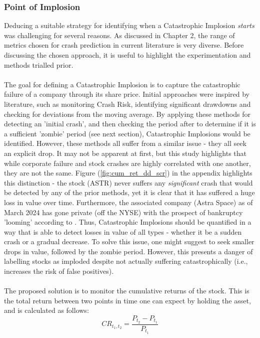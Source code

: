 \documentclass[a4paper]{report}
\begin{document}
\subsubsection{Point of Implosion}
Deducing a suitable strategy for identifying when a Catastrophic Implosion \textit{starts} was challenging for several reasons. As discussed in Chapter 2, the range of metrics chosen for crash prediction in current literature is very diverse. Before discussing the chosen approach, it is useful to highlight the experimentation 
and methods trialled prior.\\\\The goal for defining a Catastrophic Implosion is to capture the catastrophic failure of a company through its share price. Initial approaches were inspired by literature, such as monitoring Crash Risk, identifying significant drawdowns and checking
for deviations from the moving average. By applying these methods for detecting an 'initial crash', and then checking the period after to determine if it is a sufficient 'zombie' period (see next section), Catastrophic Implosions would be identified. However, these methods all suffer from a similar issue - they all 
seek an explicit drop. It may not be apparent at first, but this study highlights that while corporate failure and stock crashes are highly correlated with one another, they are not the same. Figure (\ref{fig:cum_ret_dd_scr}) in the appendix highlights this distinction - the stock (ASTR) never suffers any \textit{significant} crash that would be 
detected by any of the prior methods, yet it is clear that it has suffered a huge loss in value over time. Furthermore, the associated company (Astra Space) as of March 2024 has gone private (off the NYSE) with the prospect of bankruptcy 'looming' according to \cite{space}. Thus, Catastrophic Implosions 
should be quantified in a way that is able to detect losses in value of all types - whether it be a sudden crash or a gradual decrease. To solve this issue, one might suggest to seek smaller drops in value, followed by the zombie period. However, this presents a danger of labelling stocks as imploded despite not actually 
suffering catastrophically (i.e., increases the risk of false positives).\\\\The proposed solution is to monitor the cumulative returns of the stock. This is the total return between two points in time one can expect by holding the asset, and is calculated as follows:
\begin{equation}\label{eq:adjusted_price}
  CR_{t_1,t_2} = \frac{{P_{t_2} - P_{t_1}}}{{P_{t_1}}}
\end{equation}
\end{document}
